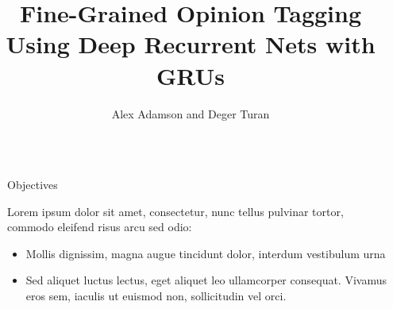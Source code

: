 \documentclass[final]{beamer}
\title{Fine-Grained Opinion Tagging Using Deep Recurrent Nets with GRUs} %
\author{Alex Adamson and Deger Turan} %
\institute{Stanford University} %
\newlength{\sepwid}
\newlength{\onecolwid}
\begin{document}
\nocite{*}

\makeatletter
\renewcommand{\overset}[2]{\ensuremath{\mathop{\kern\z@\mbox{#2}}\limits^{\mbox{\scriptsize #1}}}}
\renewcommand{\underset}[2]{\ensuremath{\mathop{\kern\z@\mbox{#2}}\limits_{\mbox{\scriptsize #1}}}}
\makeatother


\setlength{\belowcaptionskip}{2ex} %
\setlength\belowdisplayshortskip{2ex} %

\begin{frame}[t] %

\begin{columns}[t] %

\begin{column}{\sepwid}\end{column} %

\begin{column}{\onecolwid} %


\begin{alertblock}{Objectives}

Lorem ipsum dolor sit amet, consectetur, nunc tellus pulvinar tortor, commodo eleifend risus arcu sed odio:
\begin{itemize}
\item Mollis dignissim, magna augue tincidunt dolor, interdum vestibulum urna
\item Sed aliquet luctus lectus, eget aliquet leo ullamcorper consequat. Vivamus eros sem, iaculis ut euismod non, sollicitudin vel orci.
\end{itemize}

\end{alertblock}



\end{column}
\end{columns}
\end{frame}
\end{document}

